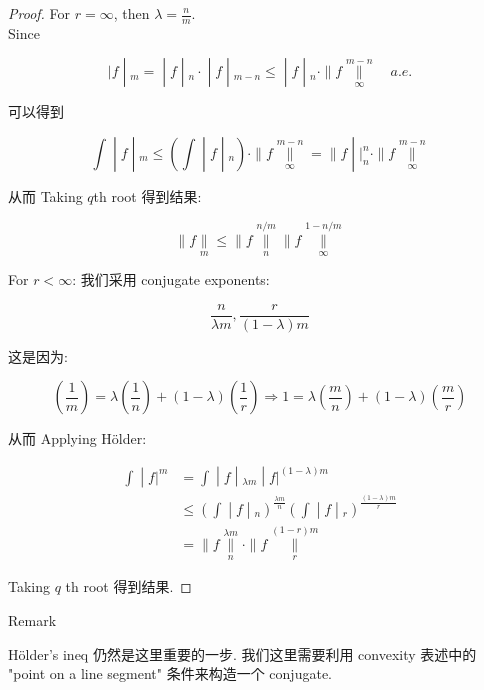 \begin{proof}

For \(r = \infty\), then \(\lambda = \frac{n}{m}\).\\
Since

\[\left. |f \middle| {}_{m} = \middle| f \middle| {}_{n} \cdot \middle| f \middle| {}_{m - n} \leq \middle| f \middle| {}_{n} \cdot \parallel f\underset{\infty}{\overset{m - n}{\parallel}}\quad a.e. \right.\]

可以得到

\[\left. \int \middle| f \middle| {}_{m} \leq (\int \middle| f \middle| {}_{n}) \cdot \parallel f\underset{\infty}{\overset{m - n}{\parallel}} = \parallel f \middle| |_{n}^{n} \cdot \parallel f\underset{\infty}{\overset{m - n}{\parallel}} \right.\]

从而 Taking \(q\)th root 得到结果:

\[\parallel f\underset{m}{\parallel} \leq \parallel f\underset{n}{\overset{n/m}{\parallel}} \parallel f\underset{\infty}{\overset{1 - n/m}{\parallel}}\]

For \(r < \infty\): 我们采用 conjugate exponents:

\[\frac{n}{\lambda m},\frac{r}{(1 - \lambda)m}\]

这是因为:

\[(\frac{1}{m}) = \lambda(\frac{1}{n}) + (1 - \lambda)(\frac{1}{r})\Longrightarrow 1 = \lambda(\frac{m}{n}) + (1 - \lambda)(\frac{m}{r})\]

从而 Applying Hölder:

\[\begin{matrix}
\left. \int \middle| f|^{m} \right. & \left. = \int \middle| f \middle| {}_{\lambda m} \middle| f|^{(1 - \lambda)m} \right. \\
 & \left. \leq (\int \middle| f \middle| {}_{n})^{\frac{\lambda m}{n}}(\int \middle| f \middle| {}_{r})^{\frac{(1 - \lambda)m}{r}} \right. \\
 & {= \parallel f\underset{n}{\overset{\lambda m}{\parallel}} \cdot \parallel f\underset{r}{\overset{(1 - r)m}{\parallel}}}
\end{matrix}\]

Taking \(q\) th root 得到结果.

\end{proof}

\begin{qlremark}{Remark}

Hölder's ineq 仍然是这里重要的一步. 我们这里需要利用 convexity 表述中的 "point on a line segment" 条件来构造一个 conjugate.

\end{qlremark}

